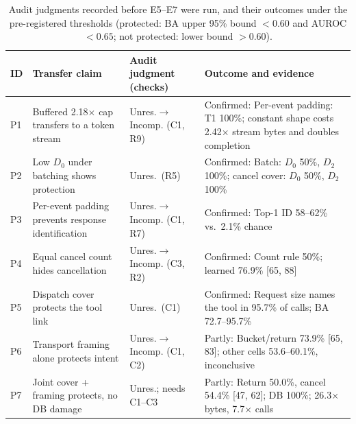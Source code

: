 \begin{table}[t]\centering\footnotesize
\caption{Audit judgments recorded before E5--E7 were run, and their outcomes under the pre-registered thresholds (protected: BA upper 95\% bound $<0.60$ and AUROC $<0.65$; not protected: lower bound $>0.60$).}\label{tab:transfer-predictions}
\setlength{\tabcolsep}{3pt}
\begin{tabularx}{\textwidth}{@{}lp{}p{}Y@{}}\toprule
ID & Transfer claim & Audit judgment (checks) & Outcome and evidence\\\midrule
P1 & Buffered 2.18$\times$ cap transfers to a token stream & Unres.$\to$Incomp. (C1, R9) & Confirmed: Per-event padding: T1 100\%; constant shape costs 2.42$\times$ stream bytes and doubles completion\\
P2 & Low $D_0$ under batching shows protection & Unres.\ (R5) & Confirmed: Batch: $D_0$ 50\%, $D_2$ 100\%; cancel cover: $D_0$ 50\%, $D_2$ 100\%\\
P3 & Per-event padding prevents response identification & Unres.$\to$Incomp. (C1, R7) & Confirmed: Top-1 ID 58--62\% vs.\ 2.1\% chance\\
P4 & Equal cancel count hides cancellation & Unres.$\to$Incomp. (C3, R2) & Confirmed: Count rule 50\%; learned 76.9\% [65, 88]\\
P5 & Dispatch cover protects the tool link & Unres.\ (C1) & Confirmed: Request size names the tool in 95.7\% of calls; BA 72.7--95.7\%\\
P6 & Transport framing alone protects intent & Unres.$\to$Incomp. (C1, C2) & Partly: Bucket/return 73.9\% [65, 83]; other cells 53.6--60.1\%, inconclusive\\
P7 & Joint cover + framing protects, no DB damage & Unres.; needs C1--C3 & Partly: Return 50.0\%, cancel 54.4\% [47, 62]; DB 100\%; 26.3$\times$ bytes, 7.7$\times$ calls\\
\bottomrule\end{tabularx}
\end{table}

